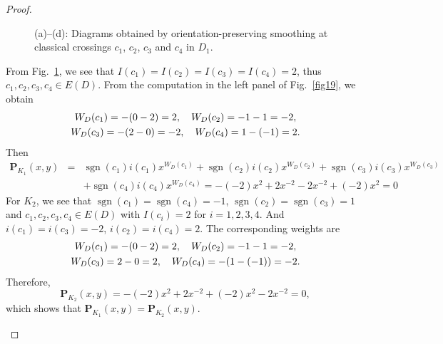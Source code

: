 \documentclass[12pt]{amsart}
\theoremstyle{noparens}
\numberwithin{equation}{section}
\numberwithin{equation}{section}
\begin{document}
\begin{proof}
\begin{figure}[!ht]
\begin{center}
			\caption{(a)--(d): Diagrams obtained by orientation-preserving smoothing at classical crossings $c_1$, $c_2$, $c_3$ and $c_4$ in $D_1$.} \label{fig18}
		\end{center}
	\end{figure} 
	From Fig.~\ref{fig18}, we see that $I(c_1)=I(c_2)=I(c_3)=I(c_4)=2$, thus $c_1,c_2,c_3,c_4\in E(D)$. From the computation in the left panel of Fig.~\ref{fig19}, we obtain 
	$$
	\begin{gathered}
		W_D(c_1)= -(0-2)=2, \quad W_D(c_2)=-1-1=-2, \cr W_D(c_3)= -(2-0) =-2, \quad W_D(c_4)=1-(-1)=2.
	\end{gathered}
	$$ 
	Then
	\begin{eqnarray*}
		\mathbf{P}_{K_1}(x,y)&=&\operatorname{sgn}(c_1) i(c_1) x^{W_D(c_1)}+\operatorname{sgn}(c_2) i(c_2) x^{W_D(c_2)}+\operatorname{sgn}(c_3) i(c_3) x^{W_D(c_3)}\\ &&+\operatorname{sgn}(c_4) i(c_4) x^{W_D(c_4)} 
		=- (-2) x^2 + 2 x^{-2}- 2 x^{-2} + (-2) x^2=0
	\end{eqnarray*}
	For $K_2$, we see that $\operatorname{sgn}(c_1)=\operatorname{sgn}(c_4)=-1$, $\operatorname{sgn}(c_2)=\operatorname{sgn}(c_3)=1$ and $c_1, c_2, c_3, c_4 \in E(D)$ with $I(c_i) = 2$ for  $i=1,2,3,4$. And $i(c_1)=i(c_3)=-2$, $i(c_2)=i(c_4)=2$.  
	The corresponding weights are 
	$$
	\begin{gathered}
		W_D(c_1) = -(0-2) = 2, \quad W_D(c_2) = -1 - 1 = -2, \cr W_D(c_3) = 2 - 0 = 2, \quad W_D(c_4) = -(1-(-1)) = -2.
	\end{gathered}
	$$  
	Therefore, 
	$$
	\mathbf{P}_{K_2}(x,y) = - (-2) x^2 + 2 x^{-2} +  (-2) x^2 - 2 x^{-2}  = 0,
	$$
	which shows that $\mathbf{P}_{K_1}(x,y) = \mathbf{P}_{K_2}(x,y)$.
	\begin{figure}[!ht]
		\begin{center}

\end{center}
\end{figure}
\end{proof}
\end{document}
